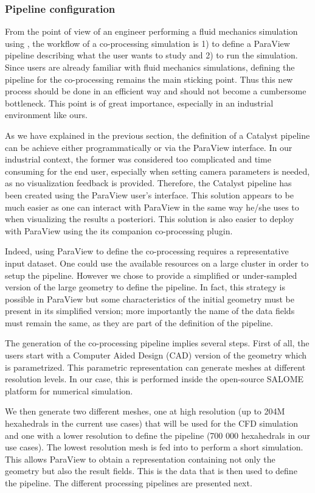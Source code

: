\subsubsection{Pipeline configuration}
\label{sec:pip_conf_tools}

From the point of view of an engineer performing a fluid mechanics simulation
using \CS, the workflow of a co-processing simulation is 1) to define
a ParaView pipeline describing what the user wants to study and 2) to run the
simulation. Since users are already familiar with fluid mechanics
simulations, defining the pipeline for the co-processing remains the main
sticking point. Thus this new process should be done in an efficient way and 
should not become a cumbersome bottleneck. This point is of great importance, especially in
an industrial environment like ours.

As we have explained in the previous section, the definition of a Catalyst pipeline can be achieve either 
programmatically or via the ParaView interface. In our industrial context, the former 
was considered too complicated and time consuming for the end user, especially when setting camera
parameters is needed, as no visualization feedback is provided. Therefore, the Catalyst pipeline has 
been created using the ParaView user's interface. This solution appears to be much easier as one
can interact with ParaView in the same way he/she uses to when
visualizing the results a posteriori. This solution is also easier to deploy with ParaView using the 
its companion co-processing plugin. 

Indeed, using ParaView to define the co-processing requires a representative input dataset.
One could use the available resources on a large cluster in order to setup the pipeline. However we chose to  
provide a simplified or under-sampled version of the large geometry to define the
pipeline. In fact, this strategy is possible in ParaView but some
characteristics of the initial geometry must be present in its simplified version; more importantly the name of the data fields must
remain the same, as they are part of the definition of the pipeline.

The generation of the co-processing pipeline implies several steps.
First of all, the users start with a Computer Aided Design (CAD)
version of the geometry which is parametrized. This parametric representation
can generate meshes at different resolution levels. In our case, this is
performed inside the open-source SALOME~\cite{4291178} platform for numerical simulation. 

We then generate two different meshes, one at high resolution (up to 204M
hexahedrals in the current use cases) that will be used for the CFD
simulation and one with a lower resolution to define the pipeline (700 000
hexahedrals in our use cases). The lowest resolution mesh is fed into \CS to perform a short
simulation. This allows ParaView to obtain a representation containing not
only the geometry but also the result fields. This is the data that is then used to define the pipeline.
The different processing pipelines are presented next.
